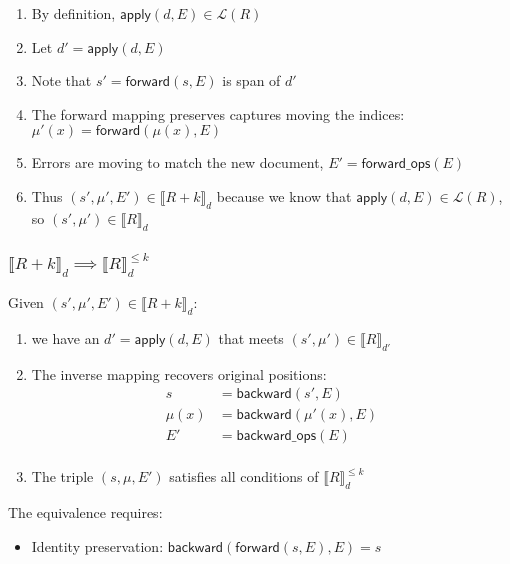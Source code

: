 \documentclass{article}
\begin{document}
\begin{enumerate}
\item By definition, $\mathsf{apply}(d,E) \in \mathcal{L}(R)$
\item Let $d' = \mathsf{apply}(d,E)$
\item Note that $s' = \mathsf{forward}(s,E)$ is span of $d'$
\item The forward mapping preserves captures moving the indices: $\mu'(x) = \mathsf{forward}(\mu(x), E)$
\item Errors are moving to match the new document, $E' = \mathsf{forward\_ops}(E)$
\item Thus $(s', \mu', E') \in \llbracket R + k \rrbracket_d$ because we know that $\mathsf{apply}(d,E) \in \mathcal{L}(R)$, so $(s', \mu') \in \llbracket R \rrbracket_d$
\end{enumerate}

\subsubsection{$\llbracket R + k \rrbracket_d \implies \llbracket R \rrbracket^{\leq k}_d$}
Given $(s', \mu', E') \in \llbracket R + k \rrbracket_d$:
\begin{enumerate}
\item we have an $d' = \mathsf{apply}(d,E)$ that meets $(s', \mu') \in \llbracket R \rrbracket_{d'}$
\item The inverse mapping recovers original positions:
\begin{align*}
s &= \mathsf{backward}(s', E) \\
\mu(x) &= \mathsf{backward}(\mu'(x), E) \\
E' &= \mathsf{backward\_ops}(E)\\
\end{align*}
\item The triple $(s, \mu, E')$ satisfies all conditions of $\llbracket R \rrbracket^{\leq k}_d$
\end{enumerate}



The equivalence requires:
\begin{itemize}
\item Identity preservation: $\mathsf{backward}(\mathsf{forward}(s,E),E) = s$
\end{itemize}
\end{document}
